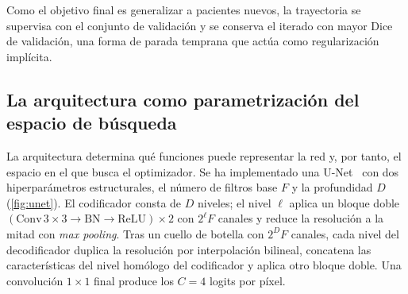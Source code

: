 Como el objetivo final es generalizar a pacientes nuevos, la trayectoria se supervisa con el conjunto de validación y se conserva el iterado con mayor Dice de validación, una forma de parada temprana que actúa como regularización implícita.

\subsection{La arquitectura como parametrización del espacio de búsqueda}\label{subsec:arquitectura}

La arquitectura determina qué funciones puede representar la red y, por tanto, el espacio en el que busca el optimizador. Se ha implementado una U-Net~\cite{ronneberger2015unet} con dos hiperparámetros estructurales, el número de filtros base $F$ y la profundidad $D$ (\cref{fig:unet}). El codificador consta de $D$ niveles; el nivel $\ell$ aplica un bloque doble $(\text{Conv}\,3{\times}3 \to \text{BN} \to \text{ReLU})\times2$ con $2^{\ell}F$ canales y reduce la resolución a la mitad con \emph{max pooling}. Tras un cuello de botella con $2^{D}F$ canales, cada nivel del decodificador duplica la resolución por interpolación bilineal, concatena las características del nivel homólogo del codificador y aplica otro bloque doble. Una convolución $1\times1$ final produce los $C=4$ logits por píxel.

